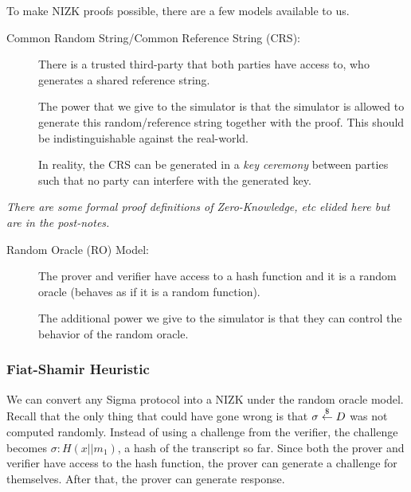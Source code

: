 To make NIZK proofs possible, there are a few models available to us.

\begin{mdframed}[style=mdgreenbox]
    \begin{description}
        \item[Common Random String/Common Reference String (CRS):] There is a trusted third-party that both parties have access to, who generates a shared reference string.

            The power that we give to the simulator is that the simulator is allowed to generate this random/reference string together with the proof. This should be indistinguishable against the real-world.

            In reality, the CRS can be generated in a \emph{key ceremony} between parties such that no party can interfere with the generated key.

    \end{description}
    \emph{There are some formal proof definitions of Zero-Knowledge, etc elided here but are in the post-notes. }
\end{mdframed}

\begin{mdframed}[style=mdgreenbox]
    \begin{description}
        \item[Random Oracle (RO) Model:] The prover and verifier have access to a hash function and it is a random oracle (behaves as if it is a random function).

            The additional power we give to the simulator is that they can control the behavior of the random oracle.
    \end{description}
\end{mdframed}

\subsubsection{Fiat-Shamir Heuristic}\label{sec:mar7-fiat-shamir}
We can convert any Sigma protocol into a NIZK under the random oracle model. Recall that the only thing that could have gone wrong is that $\sigma\overset{\$}{\leftarrow} D$ was not computed randomly. Instead of using a challenge from the verifier, the challenge becomes $\sigma: H(x||m_1)$, a hash of the transcript so far. Since both the prover and verifier have access to the hash function, the prover can generate a challenge for themselves. After that, the prover can generate response.


